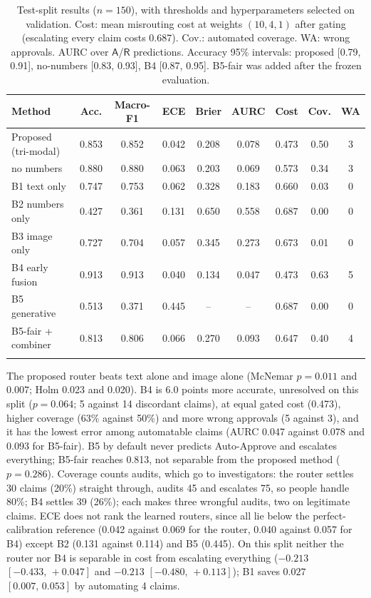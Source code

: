 \begin{table}[!htb]
\caption{Test-split results ($n=150$), with thresholds and hyperparameters selected on validation. Cost: mean misrouting cost at weights $(10,4,1)$ after gating (escalating every claim costs 0.687). Cov.: automated coverage. WA: wrong approvals. AURC over $\mathsf{A}$/$\mathsf{R}$ predictions. Accuracy 95\% intervals: proposed [0.79, 0.91], no-numbers [0.83, 0.93], B4 [0.87, 0.95]. B5-fair was added after the frozen evaluation.}\label{tab:main}
\footnotesize
\begin{tabular*}{\textwidth}{@{\extracolsep{\fill}}lcccccccc@{}}
\toprule
Method & Acc. & Macro-F1 & ECE & Brier & AURC & Cost & Cov. & WA \\
\midrule
Proposed (tri-modal) & 0.853 & 0.852 & 0.042 & 0.208 & 0.078 & 0.473 & 0.50 & 3 \\
\quad no numbers & 0.880 & 0.880 & 0.063 & 0.203 & 0.069 & 0.573 & 0.34 & 3 \\
B1 text only & 0.747 & 0.753 & 0.062 & 0.328 & 0.183 & 0.660 & 0.03 & 0 \\
B2 numbers only & 0.427 & 0.361 & 0.131 & 0.650 & 0.558 & 0.687 & 0.00 & 0 \\
B3 image only & 0.727 & 0.704 & 0.057 & 0.345 & 0.273 & 0.673 & 0.01 & 0 \\
B4 early fusion & 0.913 & 0.913 & 0.040 & 0.134 & 0.047 & 0.473 & 0.63 & 5 \\
B5 generative & 0.513 & 0.371 & 0.445 & -- & -- & 0.687 & 0.00 & 0 \\
B5-fair + combiner & 0.813 & 0.806 & 0.066 & 0.270 & 0.093 & 0.647 & 0.40 & 4 \\
\botrule
\end{tabular*}
\end{table}

The proposed router beats text alone and image alone (McNemar $p=0.011$ and $0.007$; Holm 0.023 and 0.020). B4 is 6.0 points more accurate, unresolved on this split ($p=0.064$; 5 against 14 discordant claims), at equal gated cost (0.473), higher coverage (63\% against 50\%) and more wrong approvals (5 against 3), and it has the lowest error among automatable claims (AURC 0.047 against 0.078 and 0.093 for B5-fair). B5 by default never predicts Auto-Approve and escalates everything; B5-fair reaches 0.813, not separable from the proposed method ($p=0.286$). Coverage counts audits, which go to investigators: the router settles 30 claims (20\%) straight through, audits 45 and escalates 75, so people handle 80\%; B4 settles 39 (26\%); each makes three wrongful audits, two on legitimate claims. ECE does not rank the learned routers, since all lie below the perfect-calibration reference (0.042 against 0.069 for the router, 0.040 against 0.057 for B4) except B2 (0.131 against 0.114) and B5 (0.445). On this split neither the router nor B4 is separable in cost from escalating everything ($-0.213$ $[-0.433,\,+0.047]$ and $-0.213$ $[-0.480,\,+0.113]$); B1 saves $0.027$ $[0.007,\,0.053]$ by automating 4 claims.

